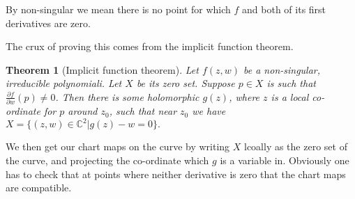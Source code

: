 \documentclass[draft, 11pt]{article} %
\theoremstyle{plain}
\newtheorem{thm}[defn]{Theorem}
\theoremstyle{remark}
\begin{document}
By non-singular we mean there is no point for which $f$ and both of its first derivatives are zero.

The crux of proving this comes from the implicit function theorem.

\begin{thm}[Implicit function theorem]
Let $f(z,w)$ be a non-singular, irreducible polynomiali.
Let $X$ be its zero set.
Suppose $p\in X$ is such that $\frac{\partial f}{\partial w}(p) \neq 0$.
Then there is some holomorphic $g(z)$, where $z$ is a local co-ordinate for $p$ around $z_0$, such that near $z_0$ we have $X=\{(z,w)\in \mathbb C^2|g(z)-w = 0\}.$
\end{thm}

We then get our chart maps on the curve by writing $X$ lcoally as the zero set of the curve, and projecting the co-ordinate which $g$ is a variable in. Obviously one has to check that at points where neither derivative is zero that the chart maps are compatible.

%

\end{document}
